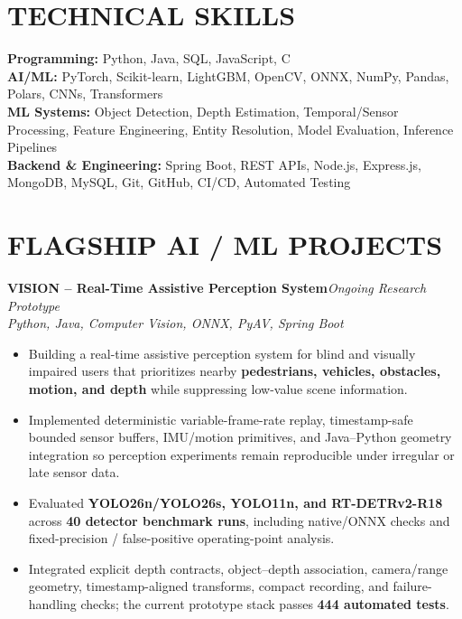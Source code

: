 \documentclass[letterpaper,11pt]{article}
\newcommand{\resumeItem}[1]{\item \small\justifying #1}
\newcommand{\resumeItemListStart}{%
  \begin{itemize}[
    leftmargin=0.20in,
    label=\raisebox{0.20ex}{\tiny$\bullet$},
    itemsep=2.5pt,
    topsep=3pt,
    parsep=0pt,
    partopsep=0pt
  ]
}
\newcommand{\resumeItemListEnd}{\end{itemize}\vspace{-1pt}}
\newcommand{\projectHeading}[3]{%
  \par\noindent\textbf{\large #1}\hfill\textit{\small #2}\\[-1pt]
  {\small\color{Muted}\textit{#3}}\par\vspace{2pt}
}
\begin{document}
\section{TECHNICAL SKILLS}
\small
\textbf{Programming:} Python, Java, SQL, JavaScript, C\\[2pt]
\textbf{AI/ML:} PyTorch, Scikit-learn, LightGBM, OpenCV, ONNX, NumPy, Pandas, Polars, CNNs, Transformers\\[2pt]
\textbf{ML Systems:} Object Detection, Depth Estimation, Temporal/Sensor Processing, Feature Engineering, Entity Resolution, Model Evaluation, Inference Pipelines\\[2pt]
\textbf{Backend \& Engineering:} Spring Boot, REST APIs, Node.js, Express.js, MongoDB, MySQL, Git, GitHub, CI/CD, Automated Testing
\vspace{-2pt}

\section{FLAGSHIP AI / ML PROJECTS}

\projectHeading
  {VISION -- Real-Time Assistive Perception System\hspace{5pt}\href{https://github.com/Vineet-2028/VISION}{\raisebox{0.15ex}{\footnotesize\faGithub}}}
  {Ongoing Research Prototype}
  {Python, Java, Computer Vision, ONNX, PyAV, Spring Boot}
\resumeItemListStart
  \resumeItem{Building a real-time assistive perception system for blind and visually impaired users that prioritizes nearby \textbf{pedestrians, vehicles, obstacles, motion, and depth} while suppressing low-value scene information.}
  \resumeItem{Implemented deterministic variable-frame-rate replay, timestamp-safe bounded sensor buffers, IMU/motion primitives, and Java--Python geometry integration so perception experiments remain reproducible under irregular or late sensor data.}
  \resumeItem{Evaluated \textbf{YOLO26n/YOLO26s, YOLO11n, and RT-DETRv2-R18} across \textbf{40 detector benchmark runs}, including native/ONNX checks and fixed-precision / false-positive operating-point analysis.}
  \resumeItem{Integrated explicit depth contracts, object--depth association, camera/range geometry, timestamp-aligned transforms, compact recording, and failure-handling checks; the current prototype stack passes \textbf{444 automated tests}.}
\resumeItemListEnd
\vspace{6pt}
\end{document}
